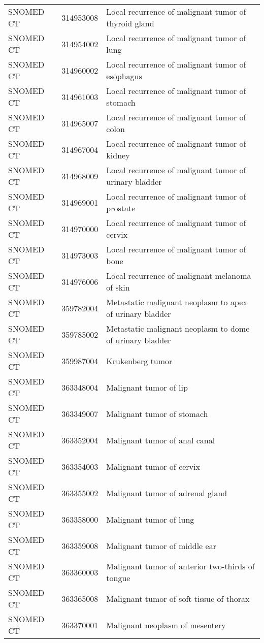 \begin{longtable}{p{}p{}p{}}
  SNOMED CT & 314953008 & Local recurrence of malignant tumor of thyroid gland \\ 
  SNOMED CT & 314954002 & Local recurrence of malignant tumor of lung \\ 
  SNOMED CT & 314960002 & Local recurrence of malignant tumor of esophagus \\ 
  SNOMED CT & 314961003 & Local recurrence of malignant tumor of stomach \\ 
  SNOMED CT & 314965007 & Local recurrence of malignant tumor of colon \\ 
  SNOMED CT & 314967004 & Local recurrence of malignant tumor of kidney \\ 
  SNOMED CT & 314968009 & Local recurrence of malignant tumor of urinary bladder \\ 
  SNOMED CT & 314969001 & Local recurrence of malignant tumor of prostate \\ 
  SNOMED CT & 314970000 & Local recurrence of malignant tumor of cervix \\ 
  SNOMED CT & 314973003 & Local recurrence of malignant tumor of bone \\ 
  SNOMED CT & 314976006 & Local recurrence of malignant melanoma of skin \\ 
  SNOMED CT & 359782004 & Metastatic malignant neoplasm to apex of urinary bladder \\ 
  SNOMED CT & 359785002 & Metastatic malignant neoplasm to dome of urinary bladder \\ 
  SNOMED CT & 359987004 & Krukenberg tumor \\ 
  SNOMED CT & 363348004 & Malignant tumor of lip \\ 
  SNOMED CT & 363349007 & Malignant tumor of stomach \\ 
  SNOMED CT & 363352004 & Malignant tumor of anal canal \\ 
  SNOMED CT & 363354003 & Malignant tumor of cervix \\ 
  SNOMED CT & 363355002 & Malignant tumor of adrenal gland \\ 
  SNOMED CT & 363358000 & Malignant tumor of lung \\ 
  SNOMED CT & 363359008 & Malignant tumor of middle ear \\ 
  SNOMED CT & 363360003 & Malignant tumor of anterior two-thirds of tongue \\ 
  SNOMED CT & 363365008 & Malignant tumor of soft tissue of thorax \\ 
  SNOMED CT & 363370001 & Malignant neoplasm of mesentery \\ 

\end{longtable}
